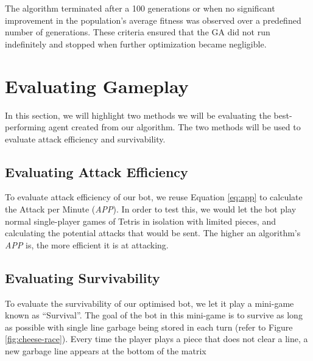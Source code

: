 \documentclass[a4paper, 12pt]{extreport}
\begin{document}
			The algorithm terminated after a 100 generations or when no significant improvement in the population's average fitness was observed over a predefined number of generations. These criteria ensured that the GA did not run indefinitely and stopped when further optimization became negligible.
	
	\section{Evaluating Gameplay}\label{sec:evaluation}
	
	In this section, we will highlight two methods we will be evaluating the best-performing agent created from our algorithm. The two methods will be used to evaluate attack efficiency and survivability.
	
	\subsection{Evaluating Attack Efficiency}
	
	To evaluate attack efficiency of our bot, we reuse Equation \ref{eq:app} to calculate the Attack per Minute (\textit{APP}). In order to test this, we would let the bot play normal single-player games of Tetris in isolation with limited pieces, and calculating the potential attacks that would be sent. The higher an algorithm's \textit{APP} is, the more efficient it is at attacking.
	
	\subsection{Evaluating Survivability}
	
	To evaluate the survivability of our optimised bot, we let it play a mini-game known as ``Survival''. The goal of the bot in this mini-game is to survive as long as possible with single line garbage being stored in each turn (refer to Figure \ref{fig:cheese-race}). Every time the player plays a piece that does not clear a line, a new garbage line appears at the bottom of the matrix
	
\end{document}
